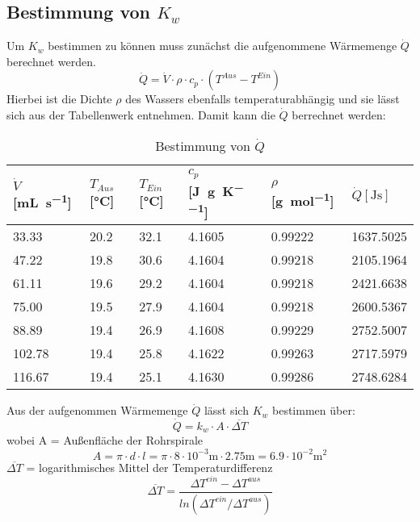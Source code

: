 \documentclass[12pt]{article}
\begin{document}
\subsection{Bestimmung von $K _w$}
Um $K _w$ bestimmen zu können muss zunächst die aufgenommene Wärmemenge $\dot Q$ berechnet werden.
\begin{equation}
  \dot Q = \dot V \cdot \rho \cdot c _p \cdot (T^{Aus}-T^{Ein})
\end{equation}
Hierbei ist die Dichte $\rho$ des Wassers ebenfalls temperaturabhängig und sie lässt sich aus der Tabellenwerk \cite{crc3} entnehmen.
Damit kann die $\dot Q$ berrechnet werden:
\begin{table}[ht!]
  \centering
 \begin{tabularx}{\textwidth}{XXXXXX}
 $\dot V$ [\si{\milli\liter\per\second}] & $T _{Aus}$ [\si{\celsius}] &  $T _{Ein}$ [\si{\celsius}] & $c _p$ [\si{\joule\per\gram\per\kelvin}]
 & $\rho$ [\si{\gram\per\mol}] & $\dot Q [\si{\joule\second}] $\\
\hline
\rowcolor{LightCyan}
33.33  & 20.2 & 32.1 & 4.1605 & 0.99222 &1637.5025 \\
47.22  & 19.8 & 30.6 & 4.1604 & 0.99218 &2105.1964 \\
61.11  & 19.6 & 29.2 & 4.1604 & 0.99218 &2421.6638 \\
75.00  & 19.5 & 27.9 & 4.1604 & 0.99218 &2600.5367 \\
88.89  & 19.4 & 26.9 & 4.1608 & 0.99229 &2752.5007 \\
102.78 & 19.4 & 25.8 & 4.1622 & 0.99263 &2717.5979 \\
116.67 & 19.4 & 25.1 & 4.1630 & 0.99286 &2748.6284 \\
\end{tabularx}
  \caption{Bestimmung von $\dot Q$}
\end{table}
Aus der aufgenommen Wärmemenge $\dot Q$ lässt sich $K _w$ bestimmen über:
\begin{equation}
  \dot Q = k _w \cdot A \cdot \overline{\Delta T}
\end{equation}
wobei A = Außenfläche der Rohrspirale
 \begin{equation}
   A = \pi \cdot d \cdot l = \pi \cdot 8 \cdot 10^{-3} \si{\meter} \cdot 2.75 \si{\meter} = 6.9 \cdot 10^{-2} \si{\square\meter}
 \end{equation}
 $ \overline{\Delta T}$ = logarithmisches Mittel der Temperaturdifferenz
 \begin{equation}
   \overline{\Delta T} = \frac{\Delta T^{ein}-\Delta T^{aus}}{ln(\Delta T^{ein}/\Delta T^{aus})}
 \end{equation}
\end{document}
